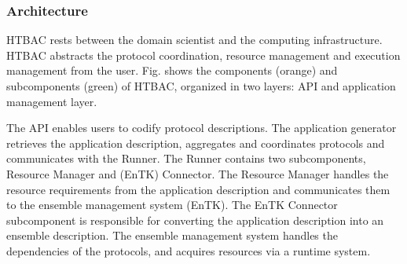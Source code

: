 




\subsubsection{Architecture}



HTBAC rests between the domain scientist and the computing infrastructure.
HTBAC abstracts the protocol coordination, resource management and execution
management from the user. Fig.  shows the components (orange) and subcomponents (green) of HTBAC,
organized in two layers: API and application management layer.

The API enables users to codify protocol descriptions. The application
generator retrieves the application description, aggregates and
coordinates protocols and communicates with the Runner. The Runner contains 
two subcomponents, Resource Manager and (EnTK) Connector. The Resource Manager
handles the resource requirements from the application description and 
communicates them to the ensemble management system (EnTK). The EnTK Connector
subcomponent is responsible for converting the application description into an
ensemble description. The ensemble management system handles the dependencies of 
the protocols, and acquires resources via a runtime system. 

